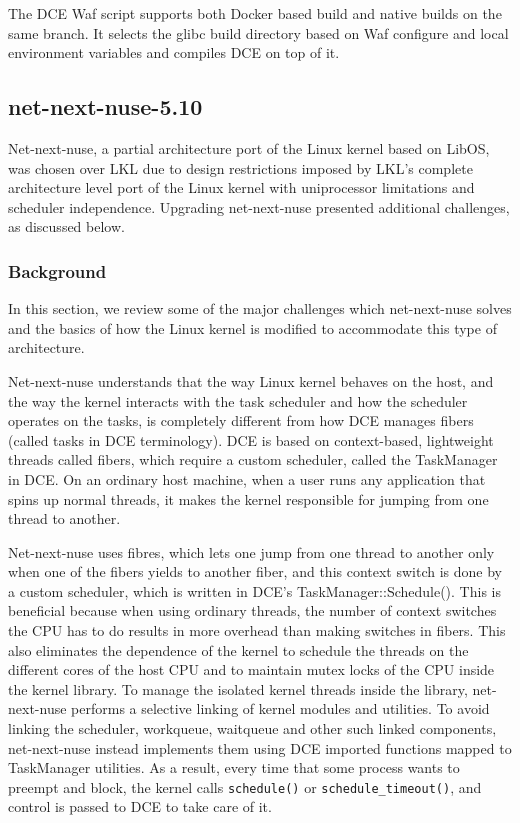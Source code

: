 \documentclass{sig-alternate}
\begin{document}
The DCE Waf script supports both Docker based build and native builds on the same branch. It selects the glibc 
build directory based on Waf configure and local environment variables and compiles DCE on top of it.

\subsection{net-next-nuse-5.10}
Net-next-nuse, a partial architecture port of the Linux kernel based on LibOS, was chosen over LKL due to design restrictions imposed by LKL's 
complete architecture level port of
the Linux kernel with uniprocessor limitations and scheduler independence. 
Upgrading net-next-nuse presented additional challenges, as discussed below.

\subsubsection{Background}
In this section, we review some of the major challenges which net-next-nuse solves and the basics of how the Linux kernel is modified to 
accommodate this type of architecture.

Net-next-nuse understands that the way Linux kernel behaves on the host, and the way the kernel interacts with the task 
scheduler and how the scheduler operates on the tasks, is completely different from how DCE manages fibers (called tasks in DCE terminology). 
DCE is based on context-based, lightweight threads called fibers, which require a custom scheduler, called the TaskManager in DCE. On an ordinary
host machine, when a user runs any application that spins up normal threads, it makes the kernel responsible for jumping from one thread to another. 

Net-next-nuse uses fibres, which lets one jump from one thread to another only when one of the fibers yields to another fiber, and this context switch 
is done by a custom scheduler, which is written in DCE's TaskManager::Schedule(). This is beneficial because when using ordinary threads, 
the number of context switches the CPU has to do
results in more overhead than making switches in fibers. This also eliminates the dependence of the kernel to schedule the threads on 
the different cores of the host CPU and to maintain mutex locks of the CPU inside the kernel library. To manage the isolated kernel threads inside the library, 
net-next-nuse  performs a selective linking of 
kernel modules and utilities. To avoid linking the scheduler, workqueue, waitqueue and other such linked components, net-next-nuse instead implements
them using DCE imported functions mapped to TaskManager utilities. As a result, every time that some process wants to preempt and block, the kernel calls 
\texttt{schedule()} or \texttt{schedule\_timeout()}, and control is passed to DCE to take care of it. 
\end{document}
